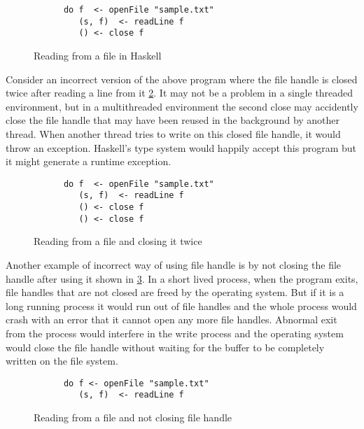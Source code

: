 \begin{figure}[h]
  \begin{framed}
    \begin{verbatim}
      do f  <- openFile "sample.txt"
         (s, f)  <- readLine f
         () <- close f
    \end{verbatim}
  \end{framed}
  \caption{Reading from a file in Haskell}
  \label{fig:file-read-close}
\end{figure}

Consider an incorrect version of the above program where the file handle is closed twice after reading a line from it \cref{fig:file-read-close-2times}.
It may not be a problem in a single threaded environment, but in a multithreaded environment
the second close may accidently close the file handle that may have been reused in the background by another thread.
When another thread tries to write on this closed file handle, it would throw an exception.
Haskell's type system would happily accept this program but it might generate a runtime exception.
\begin{figure}[h]
  \begin{framed}
    \begin{verbatim}
      do f  <- openFile "sample.txt"
         (s, f)  <- readLine f
         () <- close f
         () <- close f
    \end{verbatim}
  \end{framed}
  \caption{Reading from a file and closing it twice}
  \label{fig:file-read-close-2times}
\end{figure}

Another example of incorrect way of using file handle is by not closing the file handle after using it shown in \cref{fig:file-read-noclose}.
In a short lived process, when the program exits, file handles that are not closed are freed by the operating system.
But if it is a long running process it would run out of file handles and the whole process would crash with an error that
it cannot open any more file handles. Abnormal exit from the process would interfere in the write process
and the operating system would close the file handle without waiting for the buffer to be completely
written on the file system.
\begin{figure}[h]
  \begin{framed}
    \begin{verbatim}
      do f <- openFile "sample.txt"
         (s, f)  <- readLine f
    \end{verbatim}
  \end{framed}
  \caption{Reading from a file and not closing file handle}
  \label{fig:file-read-noclose}
\end{figure}

